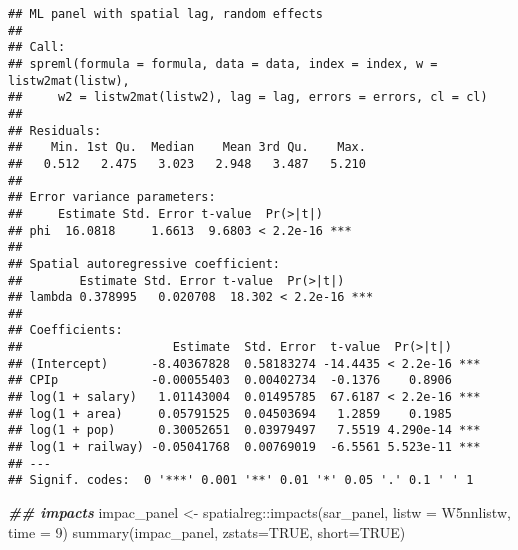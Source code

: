 \documentclass[
]{article}
\newenvironment{Shaded}{\begin{snugshade}}{\end{snugshade}}
\newcommand{\AttributeTok}[1]{\textcolor[rgb]{0.77,0.63,0.00}{#1}}
\newcommand{\ConstantTok}[1]{\textcolor[rgb]{0.00,0.00,0.00}{#1}}
\newcommand{\DecValTok}[1]{\textcolor[rgb]{0.00,0.00,0.81}{#1}}
\newcommand{\DocumentationTok}[1]{\textcolor[rgb]{0.56,0.35,0.01}{\textbf{\textit{#1}}}}
\newcommand{\FunctionTok}[1]{\textcolor[rgb]{0.00,0.00,0.00}{#1}}
\newcommand{\NormalTok}[1]{#1}
\newcommand{\OtherTok}[1]{\textcolor[rgb]{0.56,0.35,0.01}{#1}}
\newcommand{\SpecialCharTok}[1]{\textcolor[rgb]{0.00,0.00,0.00}{#1}}
\begin{document}
\begin{verbatim}
## ML panel with spatial lag, random effects 
## 
## Call:
## spreml(formula = formula, data = data, index = index, w = listw2mat(listw), 
##     w2 = listw2mat(listw2), lag = lag, errors = errors, cl = cl)
## 
## Residuals:
##    Min. 1st Qu.  Median    Mean 3rd Qu.    Max. 
##   0.512   2.475   3.023   2.948   3.487   5.210 
## 
## Error variance parameters:
##     Estimate Std. Error t-value  Pr(>|t|)    
## phi  16.0818     1.6613  9.6803 < 2.2e-16 ***
## 
## Spatial autoregressive coefficient:
##        Estimate Std. Error t-value  Pr(>|t|)    
## lambda 0.378995   0.020708  18.302 < 2.2e-16 ***
## 
## Coefficients:
##                     Estimate  Std. Error  t-value  Pr(>|t|)    
## (Intercept)      -8.40367828  0.58183274 -14.4435 < 2.2e-16 ***
## CPIp             -0.00055403  0.00402734  -0.1376    0.8906    
## log(1 + salary)   1.01143004  0.01495785  67.6187 < 2.2e-16 ***
## log(1 + area)     0.05791525  0.04503694   1.2859    0.1985    
## log(1 + pop)      0.30052651  0.03979497   7.5519 4.290e-14 ***
## log(1 + railway) -0.05041768  0.00769019  -6.5561 5.523e-11 ***
## ---
## Signif. codes:  0 '***' 0.001 '**' 0.01 '*' 0.05 '.' 0.1 ' ' 1
\end{verbatim}

\begin{Shaded}
\begin{Highlighting}[]
\DocumentationTok{\#\# impacts}
\NormalTok{impac\_panel }\OtherTok{\textless{}{-}}\NormalTok{ spatialreg}\SpecialCharTok{::}\FunctionTok{impacts}\NormalTok{(sar\_panel, }\AttributeTok{listw =}\NormalTok{ W5nnlistw, }\AttributeTok{time =} \DecValTok{9}\NormalTok{)}
\FunctionTok{summary}\NormalTok{(impac\_panel, }\AttributeTok{zstats=}\ConstantTok{TRUE}\NormalTok{, }\AttributeTok{short=}\ConstantTok{TRUE}\NormalTok{)}
\end{Highlighting}
\end{Shaded}
\end{document}
